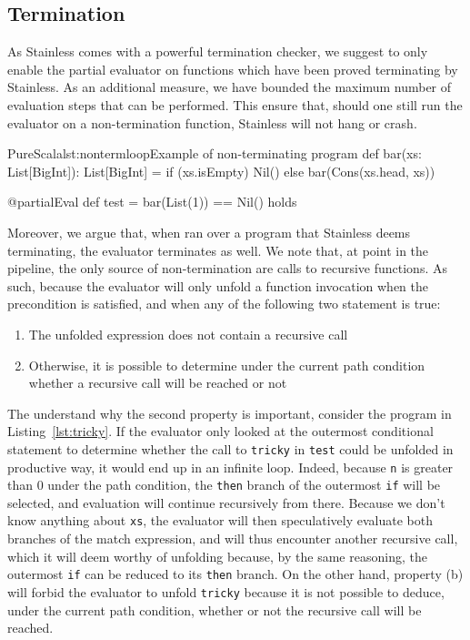 \documentclass[a4paper,twoside]{article}
\newcommand{\InlineS}[1]{\lstinline[language=PureScala,basicstyle=\small\ttfamily,columns=fixed]|#1|}
\newcommand{\RefCode}[1]{Listing~\ref{#1}}
\newcommand{\stt}[1]{\texttt{\small{#1}}}
\begin{document}
\subsection{Termination}

As Stainless comes with a powerful termination checker, we suggest to only enable the partial evaluator on functions which have been proved terminating by Stainless. As an additional measure, we have bounded the maximum number of evaluation steps that can be performed. This ensure that, should one still run the evaluator on a non-termination function, Stainless will not hang or crash.\\

\begin{Code}{PureScala}{lst:nontermloop}{Example of non-terminating program}
def bar(xs: List[BigInt]): List[BigInt] = {
  if (xs.isEmpty) Nil() else bar(Cons(xs.head, xs))
}

@partialEval
def test = {
  bar(List(1)) == Nil()
} holds
\end{Code}

Moreover, we argue that, when ran over a program that Stainless deems terminating, the  evaluator terminates as well. We note that, at point in the pipeline, the only source of non-termination are calls to recursive functions. As such, because the evaluator will only unfold a function invocation when the precondition is satisfied, and when any of the following two statement is true:

\begin{enumerate}[label=(\alph*)]
\item The unfolded expression does not contain a recursive call
\item Otherwise, it is possible to determine under the current path condition whether a recursive call will be reached or not
\end{enumerate}

The understand why the second property is important, consider the program in  \RefCode{lst:tricky}. If the evaluator only looked at the outermost conditional statement to determine whether the call to \stt{tricky} in \stt{test} could be unfolded in productive way, it would end up in an infinite loop. Indeed, because \stt{n} is greater than 0 under the path condition, the \stt{then} branch of the outermost \InlineS{if} will be selected, and evaluation will continue recursively from there. Because we don't know anything about \stt{xs}, the evaluator will then speculatively evaluate both branches of the match expression, and will thus encounter another recursive call, which it will deem worthy of unfolding because, by the same reasoning,  the outermost \InlineS{if} can be reduced to its \stt{then} branch. On the other hand, property (b) will forbid the evaluator to unfold \stt{tricky} because it is not possible to deduce, under the current path condition, whether or not the recursive call will be reached.
\end{document}
